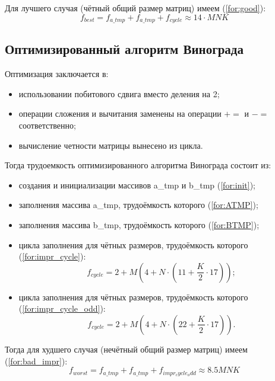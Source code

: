 Для лучшего случая (чётный общий размер матриц) имеем (\ref{for:good}):
\begin{equation}
	\label{for:good}
f_{best} =  f_{a\_tmp} + f_{a\_tmp} + f_{cycle} \approx 14 \cdot MNK
\end{equation}


\subsection{Оптимизированный алгоритм Винограда}

Оптимизация заключается в:
\begin{itemize}
    \item использовании побитового сдвига вместо деления на 2;
    \item операции сложения и вычитания заменены на операции $+=$ и $-=$ соответственно;
    \item вычисление четности матрицы вынесено из цикла.
    \newline
\end{itemize}

Тогда трудоемкость оптимизированного алгоритма Винограда состоит из:

\begin{itemize}
	\item создания и инициализации массивов a\_tmp и b\_tmp (\ref{for:init});
	
	\item заполнения массива a\_tmp, трудоёмкость которого (\ref{for:ATMP});
	
	\item заполнения массива b\_tmp, трудоёмкость которого (\ref{for:BTMP});
	
	\item цикла заполнения для чётных размеров, трудоёмкость которого (\ref{for:impr_cycle}):
	\begin{equation}
		\label{for:impr_cycle}
		f_{cycle} = 2 + M (4 + N \cdot (11 + \frac{K}{2} \cdot 17));
	\end{equation}
	
	\item цикла заполнения для чётных размеров, трудоёмкость которого (\ref{for:impr_cycle_odd}):
	\begin{equation}
		\label{for:impr_cycle_odd}
		f_{cycle} = 2 + M (4 + N \cdot (22 + \frac{K}{2} \cdot 17)).
	\end{equation}
\end{itemize}

Тогда для худшего случая (нечётный общий размер матриц) имеем (\ref{for:bad_impr}):
\begin{equation}
	\label{for:bad_impr}
	f_{worst} =  f_{a\_tmp} + f_{a\_tmp} + f_{impr_cycle_odd} \approx 8.5MNK
\end{equation}

